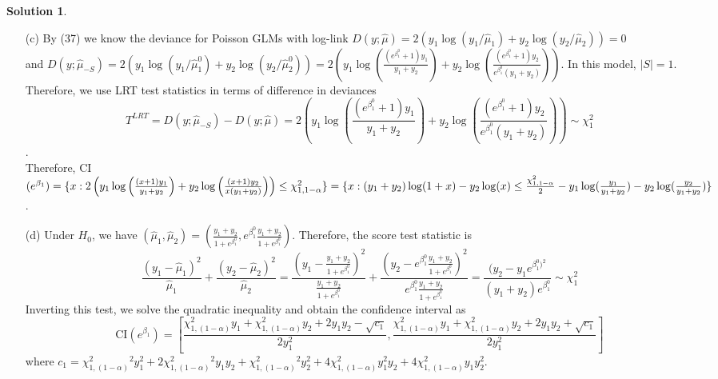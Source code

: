 \documentclass[11pt,letterpaper,english,oneside]{article}\usepackage[]{graphicx}\usepackage[]{color}
\theoremstyle{definition} %
\newtheorem{solution}{Solution}
\newenvironment{sol}{\begin{solution}\hspace{0pt}}{\end{solution}}
\begin{document}
\begin{sol}
\begin{enumerate}
    \item[(c)]
    By (37) we know the deviance for Poisson GLMs with log-link $D(y;\hat{\mu}) = 2(y_1\log(y_1/\hat{\mu}_1) +y_2\log(y_2/\hat{\mu}_2))=0$\\
    and $D(y;\hat{\mu}_{-S}) = 2(y_1\log(y_1/\hat{\mu}_1^0) +y_2\log(y_2/\hat{\mu}_2^0))=2\left(y_1 \log\left(\frac{(e^{\beta_1^0}+1)y_1 }{y_1 +y_2 }\right)+y_2 \log\left(\frac{(e^{\beta_1^0}+1)y_2 }{e^{\beta_1^0}(y_1 +y_2 )}\right)\right)$. In this model, $|S|=1$. Therefore, we use LRT test statistics in terms of difference in deviances $$T^{LRT} = D(y;\hat{\mu}_{-S})- D(y;\hat{\mu})=2\left(y_1 \log\left(\frac{(e^{\beta_1^0}+1)y_1 }{y_1 +y_2 }\right)+y_2 \log\left(\frac{(e^{\beta_1^0}+1)y_2 }{e^{\beta_1^0}(y_1 +y_2 )}\right)\right)\sim \chi^2_1$$.  \\
    Therefore, CI$(e^{\beta_1}) = \{x:2\left(y_1 \log\left(\frac{(x+1)y_1 }{y_1 +y_2 }\right)+y_2 \log\left(\frac{(x+1)y_2 }{x(y_1 +y_2 )}\right)\right) \leq \chi^2_{1,1-\alpha}\} \\
    = \{x: (y_1+y_2)\log(1+x) - y_2 \log(x) \leq \frac{\chi^2_{1,1-\alpha}}{2}-y_1 \log(\frac{y_1}{y_1+y_2}) - y_2 \log(\frac{y_2}{y_1+y_2})\}$.
    \item[(d)]
    Under $H_0$, we have $(\hat{\mu}_1, \hat{\mu}_2) = (\frac{y_1+y_2}{1+e^{\beta_1^0}}, e^{\beta_1^0}\frac{y_1+y_2}{1+e^{\beta_1^0}})$. Therefore, the score test statistic is $$\frac{(y_1-\hat{\mu}_1)^2}{\hat{\mu}_1}+\frac{(y_2-\hat{\mu}_2)^2}{\hat{\mu}_2}=\frac{(y_1-\frac{y_1+y_2}{1+e^{\beta_1^0}})^2}{\frac{y_1+y_2}{1+e^{\beta_1^0}}}+\frac{(y_2-e^{\beta_1^0}\frac{y_1+y_2}{1+e^{\beta_1^0}})^2}{e^{\beta_1^0}\frac{y_1+y_2}{1+e^{\beta_1^0}}}=\frac{(y_2-y_1e^{\beta_1^0)^2}}{(y_1+y_2)e^{\beta_1^0}}\sim \chi^2_1$$
    Inverting this test, we solve the quadratic inequality and obtain the confidence interval as 
    $$\text{CI}(e^{\beta_1}) = \left[\frac{\chi^2_{1, (1-\alpha)} y_1 +\chi^2_{1, (1-\alpha)} y_2 +2y_1 y_2 -\sqrt{c_1}}{2y_1 ^2},\frac{\chi^2_{1, (1-\alpha)} y_1 +\chi^2_{1, (1-\alpha)} y_2 +2y_1 y_2 +\sqrt{c_1}}{2y_1 ^2}\right]$$
    where $c_1 = \chi^2_{1, (1-\alpha)} ^2y_1 ^2+2\chi^2_{1, (1-\alpha)} ^2y_1 y_2+\chi^2_{1, (1-\alpha)} ^2y_2 ^2+4\chi^2_{1, (1-\alpha)} y_1 ^2y_2 +4\chi^2_{1, (1-\alpha)} y_1 y_2 ^2$.
\end{enumerate}
\end{sol}
\end{document}
